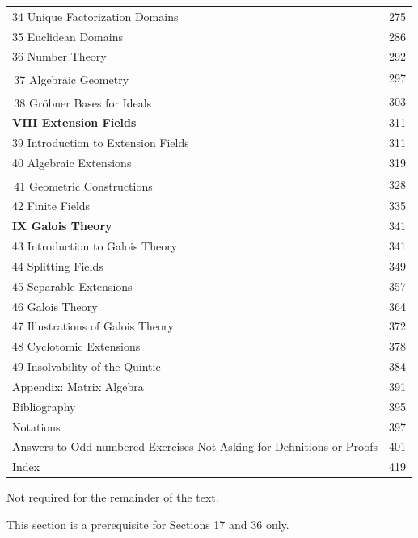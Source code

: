 \documentclass[11pt,oneside]{article}
\begin{document}
\begin{longtable}{@{}p{.83\linewidth}r@{}}
\hspace*{1em}34 Unique Factorization Domains & 275\\
\hspace*{1em}35 Euclidean Domains & 286\\
\hspace*{1em}36 Number Theory & 292\\
\hspace*{1em}\textsuperscript{\BookInline{\dagger}}\,37 Algebraic Geometry & 297\\
\hspace*{1em}\textsuperscript{\BookInline{\dagger}}\,38 Gröbner Bases for Ideals & 303\\
\textbf{VIII Extension Fields} & 311\\
\hspace*{1em}39 Introduction to Extension Fields & 311\\
\hspace*{1em}40 Algebraic Extensions & 319\\
\hspace*{1em}\textsuperscript{\BookInline{\dagger}}\,41 Geometric Constructions & 328\\
\hspace*{1em}42 Finite Fields & 335\\
\textbf{IX Galois Theory} & 341\\
\hspace*{1em}43 Introduction to Galois Theory & 341\\
\hspace*{1em}44 Splitting Fields & 349\\
\hspace*{1em}45 Separable Extensions & 357\\
\hspace*{1em}46 Galois Theory & 364\\
\hspace*{1em}47 Illustrations of Galois Theory & 372\\
\hspace*{1em}48 Cyclotomic Extensions & 378\\
\hspace*{1em}49 Insolvability of the Quintic & 384\\
Appendix: Matrix Algebra & 391\\
Bibliography & 395\\
Notations & 397\\
Answers to Odd-numbered Exercises Not Asking for Definitions or Proofs & 401\\
Index & 419\\
\end{longtable}
{\footnotesize\noindent \BookInline{\dagger} Not required for the remainder of the text.\par\noindent \BookInline{\ddagger} This section is a prerequisite for Sections 17 and 36 only.\par}
\end{document}
